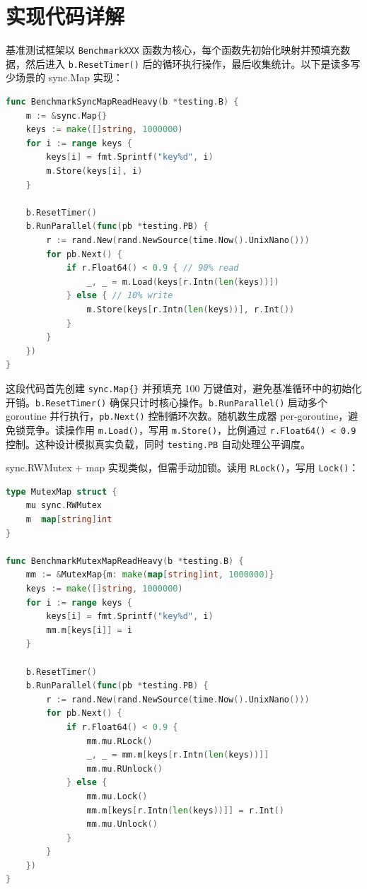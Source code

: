 \chapter{实现代码详解}
基准测试框架以 \texttt{BenchmarkXXX} 函数为核心，每个函数先初始化映射并预填充数据，然后进入 \texttt{b.ResetTimer()} 后的循环执行操作，最后收集统计。以下是读多写少场景的 sync.Map 实现：\par
\begin{lstlisting}[language=go]
func BenchmarkSyncMapReadHeavy(b *testing.B) {
    m := &sync.Map{}
    keys := make([]string, 1000000)
    for i := range keys {
        keys[i] = fmt.Sprintf("key%d", i)
        m.Store(keys[i], i)
    }
    
    b.ResetTimer()
    b.RunParallel(func(pb *testing.PB) {
        r := rand.New(rand.NewSource(time.Now().UnixNano()))
        for pb.Next() {
            if r.Float64() < 0.9 { // 90% read
                _, _ = m.Load(keys[r.Intn(len(keys))])
            } else { // 10% write
                m.Store(keys[r.Intn(len(keys))], r.Int())
            }
        }
    })
}
\end{lstlisting}
这段代码首先创建 \texttt{sync.Map\{{}\}{}} 并预填充 100 万键值对，避免基准循环中的初始化开销。\texttt{b.ResetTimer()} 确保只计时核心操作。\texttt{b.RunParallel()} 启动多个 goroutine 并行执行，\texttt{pb.Next()} 控制循环次数。随机数生成器 per-goroutine，避免锁竞争。读操作用 \texttt{m.Load()}，写用 \texttt{m.Store()}，比例通过 \texttt{r.Float64() < 0.9} 控制。这种设计模拟真实负载，同时 \texttt{testing.PB} 自动处理公平调度。\par
sync.RWMutex + map 实现类似，但需手动加锁。读用 \texttt{RLock()}，写用 \texttt{Lock()}：\par
\begin{lstlisting}[language=go]
type MutexMap struct {
    mu sync.RWMutex
    m  map[string]int
}

func BenchmarkMutexMapReadHeavy(b *testing.B) {
    mm := &MutexMap{m: make(map[string]int, 1000000)}
    keys := make([]string, 1000000)
    for i := range keys {
        keys[i] = fmt.Sprintf("key%d", i)
        mm.m[keys[i]] = i
    }
    
    b.ResetTimer()
    b.RunParallel(func(pb *testing.PB) {
        r := rand.New(rand.NewSource(time.Now().UnixNano()))
        for pb.Next() {
            if r.Float64() < 0.9 {
                mm.mu.RLock()
                _, _ = mm.m[keys[r.Intn(len(keys))]]
                mm.mu.RUnlock()
            } else {
                mm.mu.Lock()
                mm.m[keys[r.Intn(len(keys))]] = r.Int()
                mm.mu.Unlock()
            }
        }
    })
}
\end{lstlisting}
